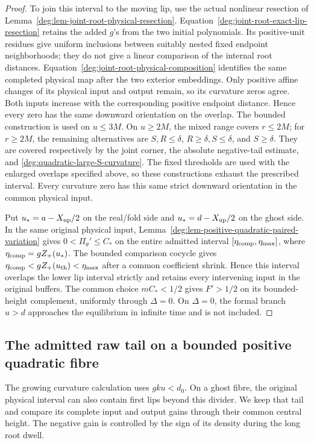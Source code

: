 \begin{proof}
To join this interval to the moving lip, use the actual nonlinear
resection of Lemma~\ref{deg:lem-joint-root-physical-resection}.
Equation~\eqref{deg:joint-root-exact-lip-resection} retains the added
\(g\)'s from the two initial polynomials. Its positive-unit residues
give uniform inclusions between suitably nested fixed endpoint
neighborhoods; they do not give a linear comparison of the internal
root distances. Equation~\eqref{deg:joint-root-physical-composition}
identifies the same completed physical map after the two exterior
embeddings. Only positive affine changes of its physical input and
output remain, so its curvature zeros agree. Both inputs increase
with the corresponding positive endpoint distance. Hence every zero
has the same downward orientation on the overlap.
The bounded construction is used on \(u\le3M\).  On \(u\ge2M\),
the mixed range covers \(r\le2M\); for \(r\ge2M\), the remaining
alternatives are \(S,R\le\delta\), \(R\ge\delta,S\le\delta\),
and \(S\ge\delta\).  They are covered respectively by the joint
corner, the absolute negative-tail estimate, and
\eqref{deg:quadratic-large-S-curvature}.  The fixed thresholds are used
with the enlarged overlaps specified above, so these constructions
exhaust the prescribed interval. Every curvature zero has this same
strict downward orientation in the common physical input.

Put \(u_*=a-X_{\rm up}/2\) on the real/fold side and
\(u_*=d-X_{\rm up}/2\) on the ghost side. In the same original
physical input, Lemma~\ref{deg:lem-positive-quadratic-paired-variation}
gives \(0<\Pi_\theta'\le C_*\) on the entire admitted interval
\([\eta_{\rm comp},\eta_{\max}]\), where
\(\eta_{\rm comp}=gZ_+(u_*)\). The bounded comparison cocycle
gives
\(\eta_{\rm comp}<gZ_+(u_{\rm th})<\eta_{\max}\) after a common
coefficient shrink. Hence this interval overlaps the lower lip
interval strictly and retains every intervening input in the
original buffers. The common choice \(mC_*<1/2\) gives
\(F'>1/2\) on its bounded-height complement, uniformly through
\(\Delta=0\).
On \(\Delta=0\), the formal branch
\(u>d\) approaches the equilibrium in infinite time and is not included.
\end{proof}

\subsection{The admitted raw tail on a bounded positive quadratic fibre}

The growing curvature calculation uses \(gku<d_0\). On a ghost
fibre, the original physical interval can also contain first lips beyond
this divider. We keep that tail and compare its complete input and output
gains through their common central height. The negative gain is controlled
by the sign of its density during the long root dwell.

